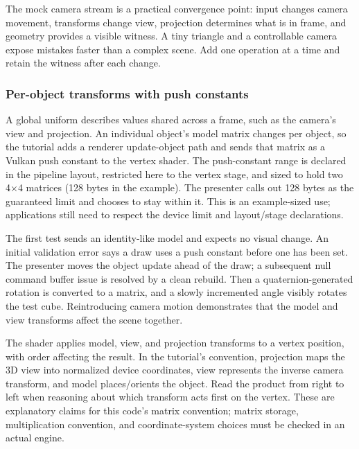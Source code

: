 The mock camera stream is a practical convergence point: input changes camera movement, transforms change view, projection determines what is in frame, and geometry provides a visible witness. A tiny triangle and a controllable camera expose mistakes faster than a complex scene. Add one operation at a time and retain the witness after each change.

\subsubsection{Per-object transforms with push constants}\label{06-engine-ii-ch026-per-object-transforms-with-push-constants}

\hypertarget{06-engine-ii-ch026-per-object-transforms-with-push-constants}{}

A global uniform describes values shared across a frame, such as the camera's view and projection. An individual object's model matrix changes per object, so the tutorial adds a renderer update-object path and sends that matrix as a Vulkan push constant to the vertex shader. The push-constant range is declared in the pipeline layout, restricted here to the vertex stage, and sized to hold two 4×4 matrices (128 bytes in the example). The presenter calls out 128 bytes as the guaranteed limit and chooses to stay within it. This is an example-sized use; applications still need to respect the device limit and layout/stage declarations.

The first test sends an identity-like model and expects no visual change. An initial validation error says a draw uses a push constant before one has been set. The presenter moves the object update ahead of the draw; a subsequent null command buffer issue is resolved by a clean rebuild. Then a quaternion-generated rotation is converted to a matrix, and a slowly incremented angle visibly rotates the test cube. Reintroducing camera motion demonstrates that the model and view transforms affect the scene together.

The shader applies model, view, and projection transforms to a vertex position, with order affecting the result. In the tutorial's convention, projection maps the 3D view into normalized device coordinates, view represents the inverse camera transform, and model places/orients the object. Read the product from right to left when reasoning about which transform acts first on the vertex. These are explanatory claims for this code's matrix convention; matrix storage, multiplication convention, and coordinate-system choices must be checked in an actual engine.


